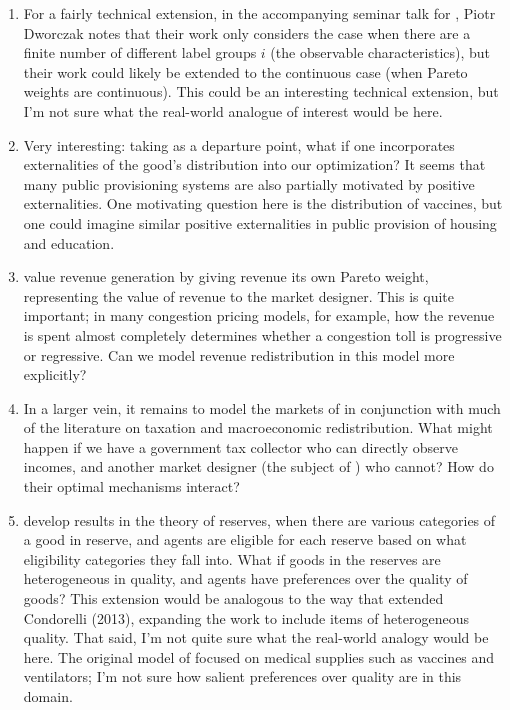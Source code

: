 \documentclass[AER]{AEA}
\begin{document}
\begin{enumerate}
    \item For a fairly technical extension, in the accompanying seminar talk for \cite{akbarpour-2020}, Piotr Dworczak notes that their work only considers the case when there are a finite number of different label groups $i$ (the observable characteristics), but their work could likely be extended to the continuous case (when Pareto weights are continuous). This could be an interesting technical extension, but I'm not sure what the real-world analogue of interest would be here.
    
    \item Very interesting: taking \cite{akbarpour-2020} as a departure point, what if one incorporates externalities of the good's distribution into our optimization? It seems that many public provisioning systems are also partially motivated by positive externalities. One motivating question here is the distribution of vaccines, but one could imagine similar positive externalities in public provision of housing and education.
    
    \item \cite{akbarpour-2020} value revenue generation by giving revenue its own Pareto weight, representing the value of revenue to the market designer. This is quite important; in many congestion pricing models, for example, how the revenue is spent almost completely determines whether a congestion toll is progressive or regressive. Can we model revenue redistribution in this model more explicitly?

    \item In a larger vein, it remains to model the markets of \cite{dworczak-2020} in conjunction with much of the literature on taxation and macroeconomic redistribution. What might happen if we have a government tax collector who can directly observe incomes, and another market designer (the subject of \cite{akbarpour-2020}) who cannot? How do their optimal mechanisms interact?
    
    \item \cite{pathak-2020} develop results in the theory of reserves, when there are various categories of a good in reserve, and agents are eligible for each reserve based on what eligibility categories they fall into. What if goods in the reserves are heterogeneous in quality, and agents have preferences over the quality of goods? This extension would be analogous to the way that \cite{akbarpour-2020} extended Condorelli (2013), expanding the work to include items of heterogeneous quality. That said, I'm not quite sure what the real-world analogy would be here. The original model of \cite{pathak-2020} focused on medical supplies such as vaccines and ventilators; I'm not sure how salient preferences over quality are in this domain.
\end{enumerate}
\end{document}
